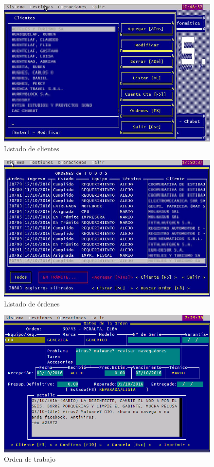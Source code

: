 \documentclass[12pt]{extarticle}
\begin{document}
    \begin{figure}[h]
    \includegraphics[scale=0.5]{images/listado_clientes.jpg}
    \caption{Listado de clientes}
    \end{figure}

    \begin{figure}[h]
    \includegraphics[scale=0.5]{images/listado_ordenes.jpg}
    \caption{Listado de órdenes}
    \end{figure}

    \begin{figure}[h]
    \includegraphics[scale=0.5]{images/orden1.png}
    \caption{Orden de trabajo}
    \end{figure}
\end{document}
